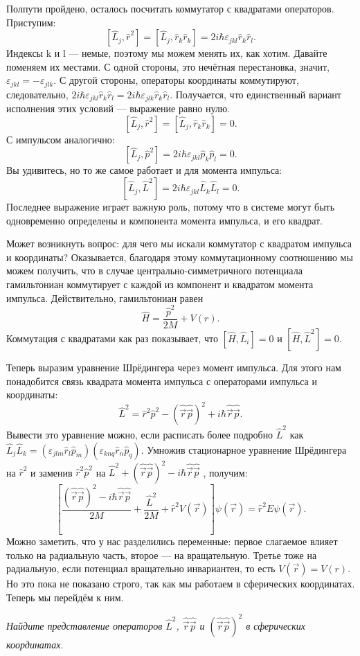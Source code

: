 Полпути пройдено, осталось посчитать коммутатор с квадратами операторов.
Приступим:
\[
  \left[\hat{L}_j, \hat{r}^2\right] = \left[\hat{L}_j, \hat{r}_k\hat{r}_k\right] = 2i\hbar\varepsilon_{jkl}\hat{r}_k\hat{r}_l.
\]
Индексы k и l --- немые, поэтому мы можем менять их, как хотим. Давайте
поменяем их местами. С одной стороны, это нечётная перестановка, значит,
$\varepsilon_{jkl} = -\varepsilon_{jlk}$. С другой стороны, операторы
координаты коммутируют, следовательно,
$2i\hbar\varepsilon_{jkl}\hat{r}_k\hat{r}_l =
  2i\hbar\varepsilon_{jlk}\hat{r}_k\hat{r}_l$. Получается, что единственный
вариант исполнения этих условий — выражение равно нулю.
\[
  \left[\hat{L}_j, \hat{r}^2\right] = \left[\hat{L}_j, \hat{r}_k\hat{r}_k\right] = 0.
\]
С импульсом аналогично:
\[
  \left[\hat{L}_j, \hat{p}^2\right] = 2i\hbar\varepsilon_{jkl}\hat{p}_k\hat{p}_l = 0.
\]
Вы удивитесь, но то же самое работает и для момента импульса:
\[
  \left[\hat{L}_j, \hat{L}^2\right] = 2i\hbar\varepsilon_{jkl}\hat{L}_k\hat{L}_l = 0.
\]
Последнее выражение играет важную роль, потому что в системе могут быть
одновременно определены и компонента момента импульса, и его квадрат.
\qedsq

Может возникнуть вопрос: для чего мы искали коммутатор с квадратом импульса и
координаты? Оказывается, благодаря этому коммутационному соотношению мы можем
получить, что в случае центрально-симметричного потенциала гамильтониан
коммутирует с каждой из компонент и квадратом момента импульса. Действительно,
гамильтониан равен
\[
  \hat{H} = \frac{\hat{p}^2}{2M} + V(r).
\]
Коммутация с квадратами как раз показывает, что $\left[\hat{H},
    \hat{L}_i\right] = 0$ и $\left[\hat{H}, \hat{L}^2\right] = 0$.

Теперь выразим уравнение Шрёдингера через момент импульса. Для этого нам
понадобится связь квадрата момента импульса с операторами импульса и
координаты:
\[
  \hat{L}^2 = \hat{r}^2\hat{p}^2 - (\hat{\Vec{r}}\hat{\Vec{p}})^2 + i\hbar\hat{\Vec{r}}\hat{\Vec{p}}.
\]
Вывести это уравнение можно, если расписать более подробно $\hat{L}^2$ как
$\hat{L}_j\hat{L}_k =
  (\varepsilon_{jlm}\hat{r}_l\hat{p}_m)(\varepsilon_{knq}\hat{r}_n\hat{p}_q)$.
Умножив стационарное уравнение Шрёдингера на $\hat{r}^2$ и заменив
$\hat{r}^2\hat{p}^2$ на $\hat{L}^2 + (\hat{\Vec{r}}\hat{\Vec{p}})^2 -
  i\hbar\hat{\Vec{r}}\hat{\Vec{p}}$ , получим:
\[
  \left[\frac{(\hat{\Vec{r}}\hat{\Vec{p}})^2 - i\hbar\hat{\Vec{r}}\hat{\Vec{p}}}{2M} + \frac{\hat{L}^2}{2M} + \hat{r}^2 V(\Vec{r})\right]\psi(\Vec{r}) = \hat{r}^2 E\psi(\Vec{r}).
\]
Можно заметить, что у нас разделились переменные: первое слагаемое влияет
только на радиальную часть, второе --- на вращательную. Третье тоже на
радиальную, если потенциал вращательно инвариантен, то есть $V(\Vec{r}) =
  V(r)$. Но это пока не показано строго, так как мы работаем в сферических
координатах. Теперь мы перейдём к ним.
\begin{exercise}
  \textit{Найдите представление операторов $\hat{L}^2$,
    $\hat{\Vec{r}}\hat{\Vec{p}}$ и $(\hat{\Vec{r}}\hat{\Vec{p}})^2$ в сферических
    координатах.}
\end{exercise}


